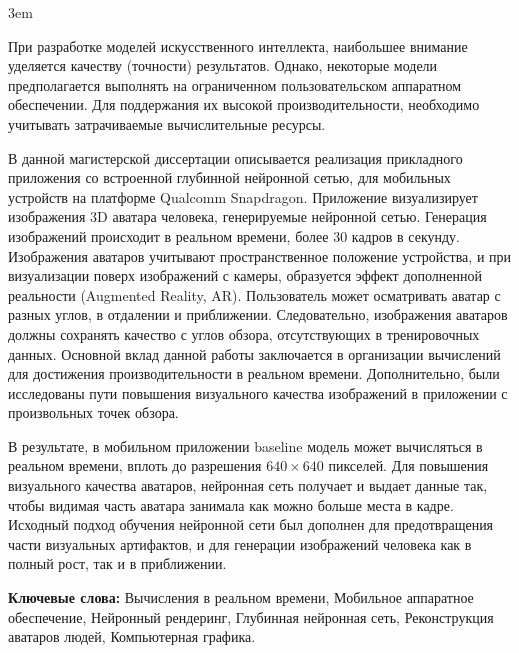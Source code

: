 \emergencystretch 3em
\par
При разработке моделей искусственного интеллекта, наибольшее внимание уделяется качеству (точности) результатов. Однако, некоторые модели предполагается выполнять на ограниченном пользовательском аппаратном обеспечении. Для поддержания их высокой производительности, необходимо учитывать затрачиваемые вычислительные ресурсы.

\par
В данной магистерской диссертации описывается реализация прикладного приложения со встроенной глубинной нейронной сетью, для мобильных устройств на платформе Qualcomm Snapdragon. Приложение визуализирует изображения 3D аватара человека, генерируемые нейронной сетью. Генерация изображений происходит в реальном времени, более 30 кадров в секунду. Изображения аватаров учитывают пространственное положение устройства, и при визуализации поверх изображений с камеры, образуется эффект дополненной реальности (Augmented Reality, AR). Пользователь может осматривать аватар с разных углов, в отдалении и приближении. Следовательно, изображения аватаров должны сохранять качество с углов обзора, отсутствующих в тренировочных данных. Основной вклад данной работы заключается в организации вычислений для достижения производительности в реальном времени. Дополнительно, были исследованы пути повышения визуального качества изображений в приложении с произвольных точек обзора.	

\par
В результате, в мобильном приложении baseline модель \cite{dnn:stylepeople21} может вычисляться в реальном времени, вплоть до разрешения $640\times640$ пикселей. Для повышения визуального качества аватаров, нейронная сеть получает и выдает данные так, чтобы видимая часть аватара занимала как можно больше места в кадре. Исходный подход обучения нейронной сети был дополнен для предотвращения части визуальных артифактов, и для генерации изображений человека как в полный рост, так и в приближении. 

\par
\textbf{Ключевые слова:} Вычисления в реальном времени, Мобильное аппаратное обеспечение, Нейронный рендеринг, Глубинная нейронная сеть, Реконструкция аватаров людей, Компьютерная графика.  
